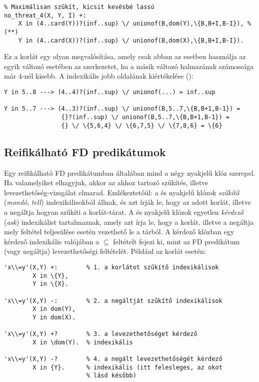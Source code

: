 \begin{verbatim}
% Maximálisan szűkít, kicsit kevésbé lassú
no_threat_4(X, Y, I) +:
    X in (4..card(Y))?(inf..sup) \/ unionof(B,dom(Y),\{B,B+I,B-I}), % (**)
    Y in (4..card(X))?(inf..sup) \/ unionof(B,dom(X),\{B,B+I,B-I}).
\end{verbatim}

Ez a  korlát egy olyan megvalósítása, amely csak abban az esetben
használja az egyik változó esetében az  szerkezetet, ha a másik változó
halmazának számossága már 4-nél kisebb. A \cd{(**)} indexikális jobb oldalának
kiértékelése ():

\begin{verbatim}
Y in 5..8 ---> (4..4)?(inf..sup) \/ unionof(...) = inf..sup

Y in 5..7 ---> (4..3)?(inf..sup) \/ unionof(B,5..7,\{B,B+1,B-1}) =
                {}?(inf..sup) \/ unionof(B,5..7,\{B,B+1,B-1}) =
                {} \/ \{5,6,4} \/ \{6,7,5} \/ \{7,8,6} = \{6}
\end{verbatim}

\subsection{Reifikálható FD predikátumok}

Egy reifikálható FD predikátumban általában mind a négy nyakjelű klóz szerepel. Ha
valamelyiket elhagyjuk, akkor az ahhoz tartozó szűkítés, illetve levezethetőség-vizsgálat
elmarad. Emlékeztetőül: a \cd{+:} és \cd{-:} nyakjelű klózok \emph{szűkítő}
(\emph{mondó}, \emph{tell}) indexikálisokból állnak, és azt írják le, hogy az adott
korlát, illetve a negáltja hogyan szűkíti a korlát-tárat. A  és  nyakjelű
klózok egyetlen \emph{kérdező} (\emph{ask}) indexikálist tartalmaznak, amely azt
írja le, hogy a korlát, illetve a negáltja mely feltétel teljesülése esetén vezethető
le a tárból. A kérdező klózban egy  kérdező indexikális valójában a
 $\subseteq$  feltételt fejezi ki, mint az FD predikátum (vagy
negáltja) levezethetőségi feltételét. Például az  korlát esetén:

\begin{verbatim}
'x\\=y'(X,Y) +:        % 1. a korlátot szűkítő indexikálisok
        X in \{Y},
        Y in \{X}.

'x\\=y'(X,Y) -:        % 2. a negáltját szűkítő indexikálisok
        X in dom(Y),
        Y in dom(X).

'x\\=y'(X,Y) +?        % 3. a levezethetőséget kérdező
        X in \dom(Y).  % indexikális

'x\\=y'(X,Y) -?        % 4. a negált levezethetőségét kérdező
        X in {Y}.      % indexikális (itt felesleges, az okot
                       % lásd később)
\end{verbatim}

